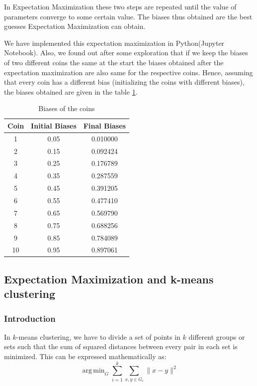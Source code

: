 \documentclass[journal, compsoc]{IEEEtran}
\DeclareMathOperator*{\argmin}{arg\,min}
\begin{document}
In Expectation Maximization these two steps are repeated until the value of parameters converge to some certain value. The biases thus obtained
are the best guesses Expectation Maximization can obtain.

We have implemented this expectation maximization in Python(Jupyter Notebook). Also, we found out after some exploration that if
we keep the biases of two different coins the same at the start the biases obtained after the expectation maximization are also
same for the respective coins.
Hence, assuming that every coin has a different bias (initializing the coins with different biases),
the biases obtained are given in the table \ref{table:biases}.
\begin{table}[!h]
\renewcommand{\arraystretch}{0.4}
\caption{Biases of the coins}
\label{table:biases}
\centering
\begin{tabular}{|c|c|c|}
\hline
{\bfseries Coin} & {\bfseries Initial Biases} & {\bfseries Final Biases}\\
\hline\hline
1 & 0.05 & 0.010000\\
\hline
2 & 0.15 & 0.092424\\
\hline
3 & 0.25 & 0.176789\\
\hline
4 & 0.35 & 0.287559\\
\hline
5 & 0.45 & 0.391205\\
\hline
6 & 0.55 & 0.477410\\
\hline
7 & 0.65 & 0.569790\\
\hline
8 & 0.75 & 0.688256\\
\hline
9 & 0.85 & 0.784089\\
\hline
10 & 0.95 & 0.897061\\
\hline
\end{tabular}
\end{table}

\subsection{Expectation Maximization and k-means clustering}
\subsubsection{Introduction}
In $k$-means clustering, we have to divide a set of points in $k$ different groups or sets such that the sum of
squared distances between every pair in each set is minimized. This can be expressed mathematically as:
\[
    \argmin_G \sum_{i = 1}^{k}\sum_{x,y\in G_{i}} \|x - y\|^{2}
\]
\end{document}
